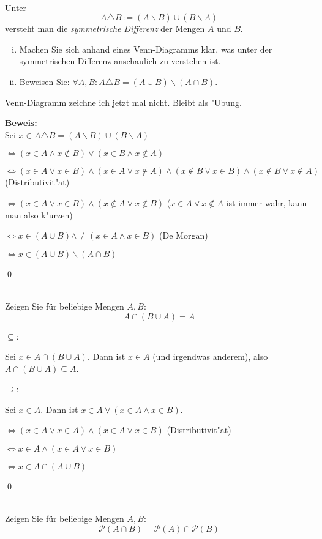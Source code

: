 \\
  Unter 
  \[A\triangle B:=(A\backslash B)\cup (B\backslash A)\] versteht man die \textit{symmetrische Differenz} der Mengen $A$ und $B$.
  \begin{enumerate}[(i)]
    \item Machen Sie sich anhand eines Venn-Diagramms klar, was unter der symmetrischen Differenz anschaulich zu verstehen ist.
    \item Beweisen Sie: $\forall A,B:A\triangle B=(A\cup B)\backslash(A\cap B)$.
  \end{enumerate}

\begin{loesung}
Venn-Diagramm zeichne ich jetzt mal nicht. Bleibt als "Ubung.

\textbf{Beweis:}\\
Sei $x\in A\triangle B=(A\backslash B)\cup (B\backslash A)$

$\Leftrightarrow (x\in A\wedge x\notin B)\vee (x\in B\wedge x\notin A)$

$\Leftrightarrow (x\in A\vee x\in B)\wedge (x\in A\vee x\notin A)\wedge (x\notin B\vee x\in B)\wedge (x\notin B\vee x\notin A)$ (Distributivit"at)

$\Leftrightarrow (x\in A\vee x\in B)\wedge (x\notin A\vee x\notin B)$ ($x\in A\vee x\notin A$ ist immer wahr, kann man also k"urzen)

$\Leftrightarrow x\in (A\cup B)\wedge \neq (x\in A\wedge x\in B)$ (De Morgan)

$\Leftrightarrow x\in(A\cup B)\backslash(A\cap B)$

\qed
\end{loesung}

\\
Zeigen Sie für beliebige Mengen $A,B$:
\[A\cap (B\cup A)=A\]

\begin{loesung}
\glqq$\subseteq$\grqq:

Sei $x\in A\cap(B\cup A)$. Dann ist $x\in A$ (und irgendwas anderem), also $A\cap(B\cup A)\subseteq A$.

\glqq$\supseteq$\grqq:

Sei $x\in A$. Dann ist $x\in A\vee (x\in A\wedge x\in B)$.

$\Leftrightarrow (x\in A\vee x\in A)\wedge (x\in A\vee x\in B)$ (Distributivit"at)

$\Leftrightarrow x\in A\wedge (x\in A\vee x\in B)$

$\Leftrightarrow x\in A\cap(A\cup B)$

\qed
\end{loesung}
\\
Zeigen Sie für beliebige Mengen $A,B$:
\[\mathscr{P}(A\cap B)=\mathscr{P}(A)\cap\mathscr{P}(B)\]

